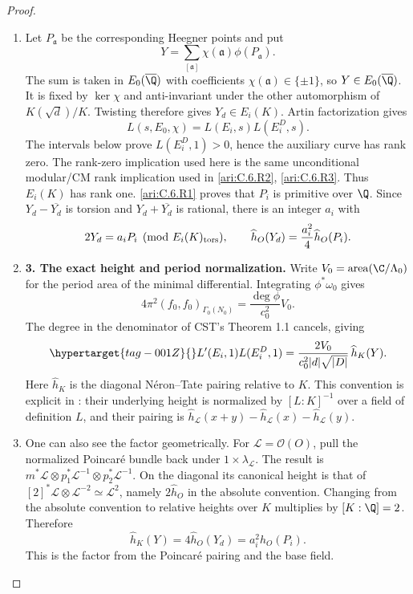 \begin{proof}
\begin{enumerate}[label=\arabic*.,leftmargin=*]
\item Let $P_{\mathfrak a}$ be the corresponding Heegner points and put
\[
 Y=\sum_{[\mathfrak a]}\chi(\mathfrak a)\phi(P_{\mathfrak a}).
\]
The sum is taken in $E_0(\overline{\Q})$ with coefficients
$\chi(\mathfrak a)\in\{\pm1\}$, so $Y\in E_0(\overline{\Q})$. It is fixed
by $\ker\chi$ and anti-invariant under the other automorphism of
$K(\sqrt d)/K$. Twisting therefore gives $Y_d\in E_i(K)$.
Artin factorization gives
\[
 L(s,E_0,\chi)=L(E_i,s)L(E_i^D,s).
\]
The intervals below prove $L(E_i^D,1)>0$, hence the auxiliary
curve has rank zero. The rank-zero implication used here is the
same unconditional modular/CM rank implication used in \cref{ari:C.6.R2}, \cref{ari:C.6.R3}.
Thus $E_i(K)$ has rank one. \ref{ari:C.6.R1} proves that $P_i$ is primitive
over $\Q$. Since $Y_d-\overline{Y_d}$ is torsion and
$Y_d+\overline{Y_d}$ is rational, there is an integer $a_i$ with
\[
 2Y_d=a_iP_i\pmod{E_i(K)_{\rm tors}},\qquad
 \widehat h_O(Y_d)=\frac{a_i^2}{4}\widehat h_O(P_i).
\]

\item \textbf{3. The exact height and period normalization.}
Write $V_0=\operatorname{area}(\C/\Lambda_0)$ for the period area
of the minimal differential. Integrating $\phi^*\omega_0$ gives
\[
 4\pi^2(f_0,f_0)_{\Gamma_0(N_0)}
   =\frac{\deg\phi}{c_0^2}V_0.
\]
The degree in the denominator of CST's Theorem 1.1 cancels, giving
\begin{equation}\hypertarget{tag-001Z}{}\label{ari:eq:Cgz-product}
 L'(E_i,1)L(E_i^D,1)
  =\frac{2V_0}{c_0^2|d|\sqrt{|D|}}\,\widehat h_K(Y).
\end{equation}
Here $\widehat h_K$ is the diagonal N\'eron--Tate pairing relative
to $K$. This convention is explicit in
\citet[\S7.1.1, pp.~218--219, Theorem 7.1.2]{CgzYZZ2011}:
their underlying height is normalized by $[L:K]^{-1}$ over a
field of definition $L$, and their pairing is
$\widehat h_{\mathcal L}(x+y)-\widehat h_{\mathcal L}(x)
-\widehat h_{\mathcal L}(y)$.

\item One can also see the factor geometrically. For
$\mathcal L=\mathcal O(O)$, pull the normalized Poincar\'e bundle
back under $1\times\lambda_{\mathcal L}$. The result is
$m^*\mathcal L\otimes p_1^*\mathcal L^{-1}\otimes
p_2^*\mathcal L^{-1}$. On the diagonal its canonical height is
that of $[2]^*\mathcal L\otimes\mathcal L^{-2}\simeq
\mathcal L^2$, namely $2\widehat h_O$ in the absolute convention.
Changing from the absolute convention to relative heights over
$K$ multiplies by $[K:\Q]=2$. Therefore
\[
 \widehat h_K(Y)=4\widehat h_O(Y_d)
                =a_i^2\widehat h_O(P_i).
\]
This is the factor from the Poincar\'e pairing and the base field.


\end{enumerate}
\end{proof}
